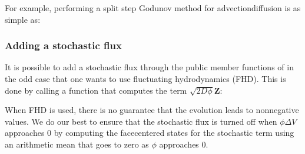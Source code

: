 \documentclass[letterpaper,10pt,english]{sphinxmanual}
\begin{document}
For example, performing a split step Godunov method for advection\sphinxhyphen{}diffusion is as simple as:

\begin{sphinxVerbatim}[commandchars=\\\{\},formatcom=\scriptsize]
   
          
   

             
   
\end{sphinxVerbatim}


\subsubsection{Adding a stochastic flux}
\label{\detokenize{CDR:adding-a-stochastic-flux}}
It is possible to add a stochastic flux through the public member functions of  in the odd case that one wants to use fluctuating hydrodynamics (FHD).
This is done by calling a function that computes the term \(\sqrt{2D\phi}\mathbf{Z}\):

\begin{sphinxVerbatim}[commandchars=\\\{\},formatcom=\scriptsize]
     
\end{sphinxVerbatim}

When FHD is used, there is no guarantee that the evolution leads to non\sphinxhyphen{}negative values.
We do our best to ensure that the stochastic flux is turned off when \(\phi \Delta V\) approaches 0 by computing the face\sphinxhyphen{}centered states for the stochastic term using an arithmetic mean that goes to zero as \(\phi\) approaches 0.
\end{document}

